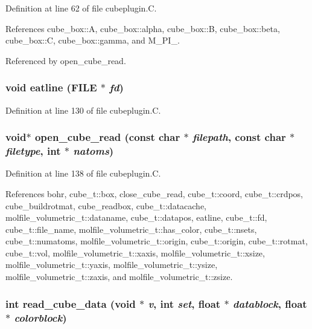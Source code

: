 Definition at line 62 of file cubeplugin.C.

References cube\_\-box::A, cube\_\-box::alpha, cube\_\-box::B, cube\_\-box::beta, cube\_\-box::C, cube\_\-box::gamma, and M\_\-PI\_.

Referenced by open\_\-cube\_\-read.
\subsubsection{\setlength{\rightskip}{0pt plus 5cm}void eatline (FILE $\ast$ {\em fd})\hspace{0.3cm}{\tt  [static]}}\label{cubeplugin_8C_a5}




Definition at line 130 of file cubeplugin.C.
\subsubsection{\setlength{\rightskip}{0pt plus 5cm}void$\ast$ open\_\-cube\_\-read (const char $\ast$ {\em filepath}, const char $\ast$ {\em filetype}, int $\ast$ {\em natoms})\hspace{0.3cm}{\tt  [static]}}\label{cubeplugin_8C_a7}




Definition at line 138 of file cubeplugin.C.

References bohr, cube\_\-t::box, close\_\-cube\_\-read, cube\_\-t::coord, cube\_\-t::crdpos, cube\_\-buildrotmat, cube\_\-readbox, cube\_\-t::datacache, molfile\_\-volumetric\_\-t::dataname, cube\_\-t::datapos, eatline, cube\_\-t::fd, cube\_\-t::file\_\-name, molfile\_\-volumetric\_\-t::has\_\-color, cube\_\-t::nsets, cube\_\-t::numatoms, molfile\_\-volumetric\_\-t::origin, cube\_\-t::origin, cube\_\-t::rotmat, cube\_\-t::vol, molfile\_\-volumetric\_\-t::xaxis, molfile\_\-volumetric\_\-t::xsize, molfile\_\-volumetric\_\-t::yaxis, molfile\_\-volumetric\_\-t::ysize, molfile\_\-volumetric\_\-t::zaxis, and molfile\_\-volumetric\_\-t::zsize.
\subsubsection{\setlength{\rightskip}{0pt plus 5cm}int read\_\-cube\_\-data (void $\ast$ {\em v}, int {\em set}, float $\ast$ {\em datablock}, float $\ast$ {\em colorblock})\hspace{0.3cm}{\tt  [static]}}\label{cubeplugin_8C_a11}




